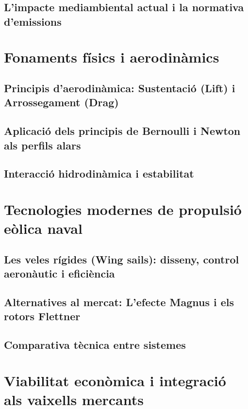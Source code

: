 \documentclass[12pt, a4paper]{report}
\begin{document}
\section{L'impacte mediambiental actual i la normativa d'emissions}

\chapter{Fonaments físics i aerodinàmics}
\section{Principis d'aerodinàmica: Sustentació (Lift) i Arrossegament (Drag)}

\section{Aplicació dels principis de Bernoulli i Newton als perfils alars}

\section{Interacció hidrodinàmica i estabilitat}

\chapter{Tecnologies modernes de propulsió eòlica naval}
\section{Les veles rígides (Wing sails): disseny, control aeronàutic i eficiència}

\section{Alternatives al mercat: L'efecte Magnus i els rotors Flettner}

\section{Comparativa tècnica entre sistemes}

\chapter{Viabilitat econòmica i integració als vaixells mercants}
\end{document}
